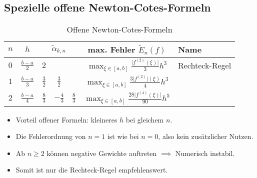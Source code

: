 \documentclass[a4paper, 11pt, accentcolor = tud3b]{tudreport}
\newcommand{\abs}[1]{\ensuremath{{\lvert #1 \rvert}}}
\begin{document}
	        \subsection{Spezielle offene Newton-Cotes-Formeln}
		        \begin{table}[H]
		        	\centering
		        	\begin{tabular}{c | c ccc c l}
		        		\textbf{\(n\)} & \textbf{\(h\)}    & \multicolumn{3}{c}{\textbf{\(\tilde{\alpha}_{k,n}\)}} & \textbf{max. Fehler \( \tilde{E}_n(f) \)}                        & \textbf{Name}  \\ \hline
		        		    \(0\)      & \(\frac{b-a}{2}\) & \(2\)           &                  &                  & \( \max_{\xi \in [a, b]} \frac{\abs{f^{(2)}(\xi)}}{3} h^3 \)     & Rechteck-Regel \\
		        		    \(1\)      & \(\frac{b-a}{3}\) & \(\frac{3}{2}\) & \(\frac{3}{2}\)  &                  & \( \max_{\xi \in [a, b]} \frac{3 \abs{f^{(2)}}(\xi)}{4} h^3 \)   &  \\
		        		    \(2\)      & \(\frac{b-a}{4}\) & \(\frac{8}{3}\) & \(-\frac{4}{3}\) & \(\frac{8}{3}\)  & \( \max_{\xi \in [a, b]} \frac{28 \abs{f^{(4)}(\xi)}}{90} h^5 \) &
		        	\end{tabular}
		        	\caption{Offene Newton-Cotes-Formeln}
		        \end{table}
		        \begin{itemize}
		        	\item Vorteil offener Formeln: kleineres \(h\) bei gleichem \(n\).
		        	\item Die Fehlerordnung von \(n=1\) ist wie bei \(n=0\), also kein zusätzlicher Nutzen.
		        	\item Ab \(n \geq 2 \) können negative Gewichte auftreten \( \implies \) Numerisch instabil.
		        	\item Somit ist nur die Rechteck-Regel empfehlenswert.
		        \end{itemize}
	
\end{document}
